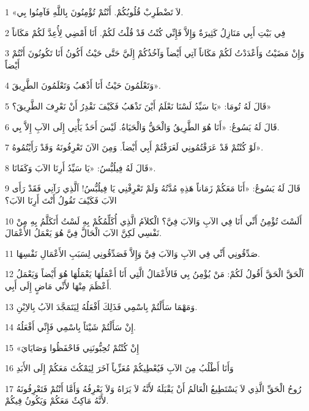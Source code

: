 \par 1 «لاَ تَضْطَرِبْ قُلُوبُكُمْ. أَنْتُمْ تُؤْمِنُونَ بِاللَّهِ فَآمِنُوا بِي.
\par 2 فِي بَيْتِ أَبِي مَنَازِلُ كَثِيرَةٌ وَإِلاَّ فَإِنِّي كُنْتُ قَدْ قُلْتُ لَكُمْ. أَنَا أَمْضِي لِأُعِدَّ لَكُمْ مَكَاناً
\par 3 وَإِنْ مَضَيْتُ وَأَعْدَدْتُ لَكُمْ مَكَاناً آتِي أَيْضاً وَآخُذُكُمْ إِلَيَّ حَتَّى حَيْثُ أَكُونُ أَنَا تَكُونُونَ أَنْتُمْ أَيْضاً
\par 4 وَتَعْلَمُونَ حَيْثُ أَنَا أَذْهَبُ وَتَعْلَمُونَ الطَّرِيقَ».
\par 5 قَالَ لَهُ تُومَا: «يَا سَيِّدُ لَسْنَا نَعْلَمُ أَيْنَ تَذْهَبُ فَكَيْفَ نَقْدِرُ أَنْ نَعْرِفَ الطَّرِيقَ؟»
\par 6 قَالَ لَهُ يَسُوعُ: «أَنَا هُوَ الطَّرِيقُ وَالْحَقُّ وَالْحَيَاةُ. لَيْسَ أَحَدٌ يَأْتِي إِلَى الآبِ إِلاَّ بِي.
\par 7 لَوْ كُنْتُمْ قَدْ عَرَفْتُمُونِي لَعَرَفْتُمْ أَبِي أَيْضاً. وَمِنَ الآنَ تَعْرِفُونَهُ وَقَدْ رَأَيْتُمُوهُ».
\par 8 قَالَ لَهُ فِيلُبُّسُ: «يَا سَيِّدُ أَرِنَا الآبَ وَكَفَانَا».
\par 9 قَالَ لَهُ يَسُوعُ: «أَنَا مَعَكُمْ زَمَاناً هَذِهِ مُدَّتُهُ وَلَمْ تَعْرِفْنِي يَا فِيلُبُّسُ! اَلَّذِي رَآنِي فَقَدْ رَأَى الآبَ فَكَيْفَ تَقُولُ أَنْتَ أَرِنَا الآبَ؟
\par 10 أَلَسْتَ تُؤْمِنُ أَنِّي أَنَا فِي الآبِ وَالآبَ فِيَّ؟ الْكلاَمُ الَّذِي أُكَلِّمُكُمْ بِهِ لَسْتُ أَتَكَلَّمُ بِهِ مِنْ نَفْسِي لَكِنَّ الآبَ الْحَالَّ فِيَّ هُوَ يَعْمَلُ الأَعْمَالَ.
\par 11 صَدِّقُونِي أَنِّي فِي الآبِ وَالآبَ فِيَّ وَإِلاَّ فَصَدِّقُونِي لِسَبَبِ الأَعْمَالِ نَفْسِهَا.
\par 12 اَلْحَقَّ الْحَقَّ أَقُولُ لَكُمْ: مَنْ يُؤْمِنُ بِي فَالأَعْمَالُ الَّتِي أَنَا أَعْمَلُهَا يَعْمَلُهَا هُوَ أَيْضاً وَيَعْمَلُ أَعْظَمَ مِنْهَا لأَنِّي مَاضٍ إِلَى أَبِي.
\par 13 وَمَهْمَا سَأَلْتُمْ بِاسْمِي فَذَلِكَ أَفْعَلُهُ لِيَتَمَجَّدَ الآبُ بِالاِبْنِ.
\par 14 إِنْ سَأَلْتُمْ شَيْئاً بِاسْمِي فَإِنِّي أَفْعَلُهُ.
\par 15 «إِنْ كُنْتُمْ تُحِبُّونَنِي فَاحْفَظُوا وَصَايَايَ
\par 16 وَأَنَا أَطْلُبُ مِنَ الآبِ فَيُعْطِيكُمْ مُعَزِّياً آخَرَ لِيَمْكُثَ مَعَكُمْ إِلَى الأَبَدِ
\par 17 رُوحُ الْحَقِّ الَّذِي لاَ يَسْتَطِيعُ الْعَالَمُ أَنْ يَقْبَلَهُ لأَنَّهُ لاَ يَرَاهُ وَلاَ يَعْرِفُهُ وَأَمَّا أَنْتُمْ فَتَعْرِفُونَهُ لأَنَّهُ مَاكِثٌ مَعَكُمْ وَيَكُونُ فِيكُمْ.
